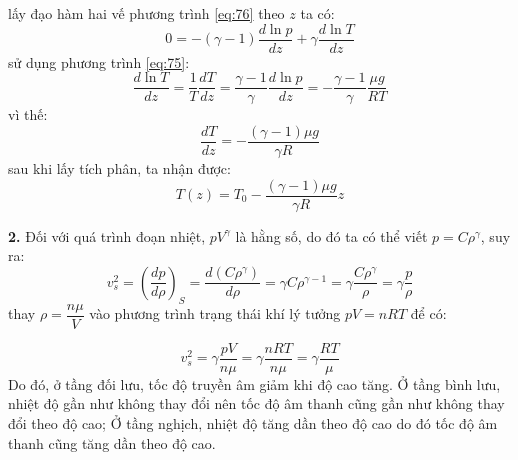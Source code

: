 lấy đạo hàm hai vế phương trình \eqref{eq:76} theo $z$ ta có:
\begin{equation}
  \label{eq:77}
  0=-(\gamma - 1)\frac{d\ln p}{dz}+\gamma\frac{d\ln T}{dz}
\end{equation}
sử dụng phương trình \eqref{eq:75}:
\begin{equation}
  \label{eq:78}
  \frac{d\ln T}{dz}=\frac{1}{T}\frac{dT}{dz}=\frac{\gamma-1}{\gamma}\frac{d\ln p}{dz}=-\frac{\gamma -1}{\gamma}\frac{\mu g}{RT}
\end{equation}
vì thế:
\begin{equation}
  \label{eq:79}
  \frac{dT}{dz}=-\frac{(\gamma -1)\mu g}{\gamma R}
\end{equation}
sau khi lấy tích phân, ta nhận được:
\begin{equation}
  \label{eq:710}
  T(z)=T_{0}-\frac{(\gamma-1)\mu g}{\gamma R}z
\end{equation}

\noindent\textbf{2.} Đối với quá trình đoạn nhiệt, $pV^{\gamma}$ là hằng số, do đó ta có thể viết $p=C\rho^{\gamma}$, suy ra:
\begin{equation}
  \label{eq:711}
  v_{s}^{2}=\left(\frac{dp}{d\rho}\right)_{S}=\frac{d(C\rho^{\gamma})}{d\rho}=\gamma C\rho^{\gamma-1}=\gamma\frac{C\rho^{\gamma}}{\rho}=\gamma\frac{p}{\rho}
\end{equation}
thay $\rho=\dfrac{n\mu}{V}$ vào phương trình trạng thái khí lý tưởng $pV=nRT$ để có:

\begin{equation}
  \label{eq:712}
  v_{s}^{2}=\gamma\frac{pV}{n\mu}=\gamma\frac{nRT}{n\mu}=\gamma\frac{RT}{\mu}
\end{equation}
Do đó, ở tầng đối lưu, tốc độ truyền âm giảm khi độ cao tăng. Ở tầng bình lưu, nhiệt độ gần như không thay đổi nên tốc độ âm thanh cũng gần như không thay đổi theo độ cao; Ở tầng nghịch, nhiệt độ tăng dần theo độ cao do đó tốc độ âm thanh cũng tăng dần theo độ cao.


